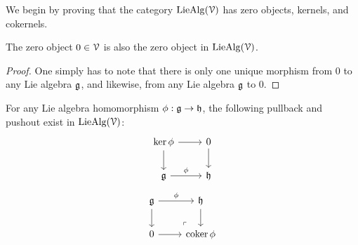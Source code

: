             We begin by proving that the category $\mathrm{Lie}\mathrm{Alg}(\mathcal{V})$ has zero objects, kernels, and cokernels.
            \begin{proposition} \label{prop: zero_lie_algebra}
                The zero object $0 \in \mathcal{V}$ is also the zero object in $\mathrm{Lie}\mathrm{Alg}(\mathcal{V})$.
            \end{proposition}
                \begin{proof}
                    One simply has to note that there is only one unique morphism from $0$ to any Lie algebra $\mathfrak{g}$, and likewise, from any Lie algebra $\mathfrak{g}$ to $0$. 
                \end{proof}
                
            \begin{proposition} \label{prop: (co)kernels_of_lie_algebra_homomorphisms}
                For any Lie algebra homomorphism $\phi: \mathfrak{g} \to \mathfrak{h}$, the following pullback and pushout exist in $\mathrm{Lie}\mathrm{Alg}(\mathcal{V})$:
                    $$
                        \begin{tikzcd}
                        	{\ker \phi} & 0 \\
                        	\g & \h
                        	\arrow["\phi", from=2-1, to=2-2]
                        	\arrow[from=1-1, to=2-1]
                        	\arrow[from=1-1, to=1-2]
                        	\arrow[from=1-2, to=2-2]
                        \end{tikzcd}
                    $$
                    $$
                        \begin{tikzcd}
                        	\g & \h \\
                        	0 & {\coker \phi}
                        	\arrow["\phi", from=1-1, to=1-2]
                        	\arrow[from=1-1, to=2-1]
                        	\arrow[from=2-1, to=2-2]
                        	\arrow[from=1-2, to=2-2]
                        	\arrow["\lrcorner"{anchor=center, pos=0.125, rotate=180}, draw=none, from=2-2, to=1-1]
                        \end{tikzcd}
                    $$
            \end{proposition}
